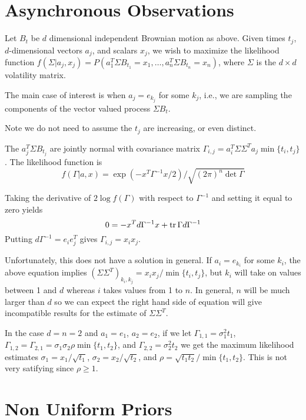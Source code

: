\documentclass[11pt,fleqn]{article}
\def\tr{\qopname\relax n{tr}}
\begin{document}
\section{Asynchronous Observations}
Let $B_t$ be $d$ dimensional independent Brownian motion
as above.
Given times $t_j$, $d$-dimensional vectors $a_j$, and
scalars $x_j$, we wish to maximize the likelihood function
$f(\Sigma|a_j, x_j) = P(a_1^T\Sigma B_{t_1} = x_1, \dots,
a_n^T\Sigma B_{t_n} = x_n)$,
where $\Sigma$ is the $d\times d$ volatility matrix.

The main case of interest is when $a_j = e_{k_j}$ for some $k_j$, i.e.,
we are sampling the components of the vector valued process $\Sigma B_t$.

Note we do not need to assume the $t_j$ are increasing, or even
distinct.

The $a_j^T\Sigma B_{t_j}$ are jointly normal with covariance matrix
$\Gamma_{i,j} = a_i^T\Sigma\Sigma^T a_j \min\{t_i, t_j\}$.
The likelihood function is 
\begin{equation*}
	f(\Gamma|a, x) = \exp(-x^T\Gamma^{-1}x/2)/
			\sqrt{(2\pi)^n\det\Gamma}
\end{equation*}

Taking the derivative of $2\log f(\Gamma)$ with respect to $\Gamma^{-1}$
and setting it equal to zero yields
\begin{equation*}
	0 = -x^Td\Gamma^{-1}x + \tr\Gamma d\Gamma^{-1}
\end{equation*}
Putting $d\Gamma^{-1} = e_ie_j^T$ gives $\Gamma_{i,j} = x_i x_j$.

Unfortunately, this does not have a solution in general.
If $a_i = e_{k_i}$ for some $k_i$, the above equation implies
$(\Sigma\Sigma^T)_{k_i,k_j} = x_i x_j/\min\{t_i, t_j\}$, but $k_i$
will take on values between 1 and $d$ whereas $i$ takes values from 1
to $n$. In general, $n$ will be much larger than $d$ so we can expect
the right hand side of equation will give incompatible results for the
estimate of $\Sigma\Sigma^T$.

In the case $d = n = 2$ and $a_1 = e_1$, $a_2 = e_2$, if we let
$\Gamma_{1,1} = \sigma_1^2 t_1$, $\Gamma_{1,2} = \Gamma_{2,1} = \sigma_1
\sigma_2 \rho \min\{t_1, t_2\}$, and $\Gamma_{2,2} = \sigma_2^2 t_2$
we get the maximum likelihood estimates $\sigma_1 = x_1/\sqrt{t_1}$,
$\sigma_2 = x_2/\sqrt{t_2}$, and $\rho = \sqrt{t_1 t_2}/\min\{t_1, t_2\}$.
This is not very satifying since $\rho\ge 1$.

\section{Non Uniform Priors}
\end{document}
